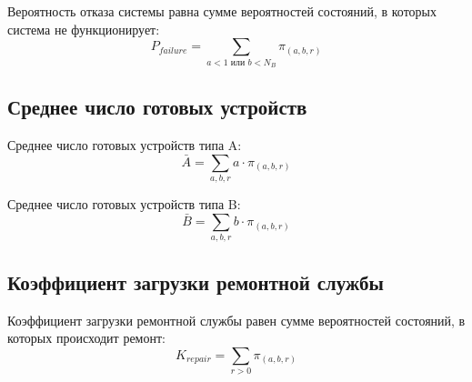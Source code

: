 \documentclass[12pt,a4paper]{article}
\begin{document}
Вероятность отказа системы равна сумме вероятностей состояний, в которых система не функционирует:
\begin{equation}
    P_{failure} = \sum_{a < 1 \text{ или } b < N_B} \pi_{(a,b,r)}
\end{equation}

\subsection{Среднее число готовых устройств}

Среднее число готовых устройств типа A:
\begin{equation}
    \bar{A} = \sum_{a,b,r} a \cdot \pi_{(a,b,r)}
\end{equation}

Среднее число готовых устройств типа B:
\begin{equation}
    \bar{B} = \sum_{a,b,r} b \cdot \pi_{(a,b,r)}
\end{equation}

\subsection{Коэффициент загрузки ремонтной службы}

Коэффициент загрузки ремонтной службы равен сумме вероятностей состояний, в которых происходит ремонт:
\begin{equation}
    K_{repair} = \sum_{r > 0} \pi_{(a,b,r)}
\end{equation}
\end{document}
